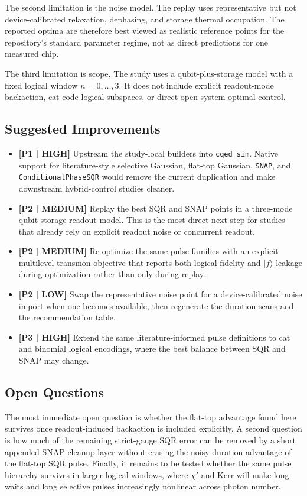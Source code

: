\documentclass[aps,pra,twocolumn,reprint,amsmath,amssymb]{revtex4-2}
\begin{document}
The second limitation is the noise model. The replay uses representative but not device-calibrated relaxation, dephasing, and storage thermal occupation. The reported optima are therefore best viewed as realistic reference points for the repository's standard parameter regime, not as direct predictions for one measured chip.

The third limitation is scope. The study uses a qubit-plus-storage model with a fixed logical window $n=0,\ldots,3$. It does not include explicit readout-mode backaction, cat-code logical subspaces, or direct open-system optimal control.

\subsection{Suggested Improvements}

\begin{itemize}
  \item \textbf{[P1 | HIGH]} Upstream the study-local builders into \texttt{cqed\_sim}. Native support for literature-style selective Gaussian, flat-top Gaussian, \texttt{SNAP}, and \texttt{ConditionalPhaseSQR} would remove the current duplication and make downstream hybrid-control studies cleaner.
  \item \textbf{[P2 | MEDIUM]} Replay the best SQR and SNAP points in a three-mode qubit-storage-readout model. This is the most direct next step for studies that already rely on explicit readout noise or concurrent readout.
  \item \textbf{[P2 | MEDIUM]} Re-optimize the same pulse families with an explicit multilevel transmon objective that reports both logical fidelity and $|f\rangle$ leakage during optimization rather than only during replay.
  \item \textbf{[P2 | LOW]} Swap the representative noise point for a device-calibrated noise import when one becomes available, then regenerate the duration scans and the recommendation table.
  \item \textbf{[P3 | HIGH]} Extend the same literature-informed pulse definitions to cat and binomial logical encodings, where the best balance between SQR and SNAP may change.
\end{itemize}

\subsection{Open Questions}

The most immediate open question is whether the flat-top advantage found here survives once readout-induced backaction is included explicitly. A second question is how much of the remaining strict-gauge SQR error can be removed by a short appended SNAP cleanup layer without erasing the noisy-duration advantage of the flat-top SQR pulse. Finally, it remains to be tested whether the same pulse hierarchy survives in larger logical windows, where $\chi'$ and Kerr will make long waits and long selective pulses increasingly nonlinear across photon number.



\end{document}

